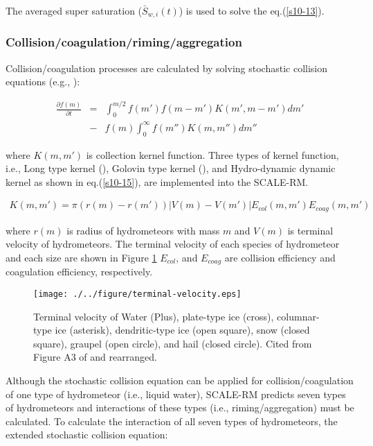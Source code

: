 The averaged super saturation ($\bar{S}_{w,i}(t)$) is used to solve the eq.(\ref{s10-13}).

\subsubsection{Collision/coagulation/riming/aggregation}
Collision/coagulation processes are calculated by solving stochastic collision equations (e.g., \cite{pk_1997}):

\begin{eqnarray}
\frac{\partial f(m)}{\partial t}&=&\int_0^{m/2}f(m')f(m-m')K(m',m-m')dm' \nonumber\\
&-&f(m)\int_0^{\infty}f(m'')K(m,m'')dm''\label{s10-14}
\end{eqnarray}

where $K(m,m')$ is collection kernel function. Three types of kernel function, i.e., Long type kernel (\cite{long_1974}), Golovin type kernel (\cite{Golovin_1963}), and Hydro-dynamic dynamic kernel as shown in eq.(\ref{s10-15}), are implemented into the SCALE-RM.

\begin{eqnarray}
K(m,m')=\pi(r(m)-r(m'))\left| V(m)-V(m')\right |E_{col}(m,m')E_{coag}(m,m')\label{s10-15}
\end{eqnarray}

where $r(m)$ is radius of hydrometeors with mass $m$ and $V(m)$ is terminal velocity of hydrometeors. The terminal velocity of each species of hydrometeor and each size are shown in Figure \ref{figs10-term} $E_{col}$, and $E_{coag}$ are collision efficiency and coagulation efficiency, respectively.\\

\begin{figure}[ht]
\begin{center}
\texttt{[image: ./../figure/terminal-velocity.eps]}
\end{center}
\caption{Terminal velocity of Water (Plus), plate-type ice (cross), columnar-type ice (asterisk), dendritic-type ice (open square), snow (closed square), graupel (open circle), and hail (closed circle). Cited from Figure A3 of \cite{suzuki_2006} and rearranged.}
\label{figs10-term}
\end{figure}


Although the stochastic collision equation can be applied for collision/coagulation of one type of hydrometeor (i.e., liquid water), SCALE-RM predicts seven types of hydrometeors and interactions of these types (i.e., riming/aggregation) must be calculated. To calculate the interaction of all seven types of hydrometeors, the extended stochastic collision equation:

